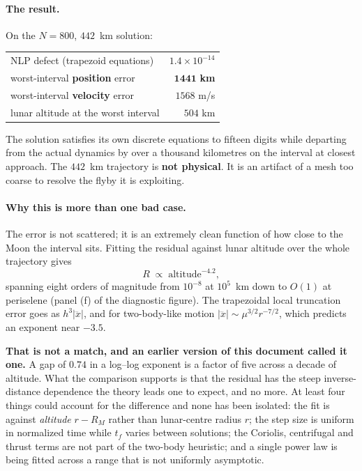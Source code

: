 \documentclass[11pt]{article}
\begin{document}
\paragraph{The result.} On the $N = 800$, $442$~km solution:

\begin{table}[h]
\centering\small
\begin{tabular}{lr}
\toprule
NLP defect (trapezoid equations) & $1.4\times10^{-14}$ \\
worst-interval \textbf{position} error & $\mathbf{1441}$ \textbf{km} \\
worst-interval \textbf{velocity} error & $1568$ m/s \\
lunar altitude at the worst interval & $504$ km \\
\bottomrule
\end{tabular}
\end{table}

The solution satisfies its own discrete equations to fifteen digits while
departing from the actual dynamics by over a thousand kilometres on the interval
at closest approach. The $442$~km trajectory is \textbf{not physical}. It is an
artifact of a mesh too coarse to resolve the flyby it is exploiting.

\paragraph{Why this is more than one bad case.} The error is not scattered; it
is an extremely clean function of how close to the Moon the interval sits.
Fitting the residual against lunar altitude over the whole trajectory gives
\[
  R \;\propto\; \text{altitude}^{-4.2},
\]
spanning eight orders of magnitude from $10^{-8}$ at $10^5$~km down to $O(1)$ at
periselene (panel (f) of the diagnostic figure). The trapezoidal local truncation error goes as
$h^3 \lvert \dddot{x} \rvert$, and for two-body-like motion
$\lvert\dddot{x}\rvert \sim \mu^{3/2} r^{-7/2}$, which predicts an exponent near
$-3.5$.

\textbf{That is not a match, and an earlier version of this document called it
one.} A gap of $0.74$ in a log--log exponent is a factor of five across a decade
of altitude. What the comparison supports is that the residual has the steep
inverse-distance dependence the theory leads one to expect, and no more. At least
four things could account for the difference and none has been isolated: the fit
is against \emph{altitude} $r - R_M$ rather than lunar-centre radius $r$; the
step size is uniform in normalized time while $t_f$ varies between solutions; the
Coriolis, centrifugal and thrust terms are not part of the two-body heuristic;
and a single power law is being fitted across a range that is not uniformly
asymptotic.
\end{document}
